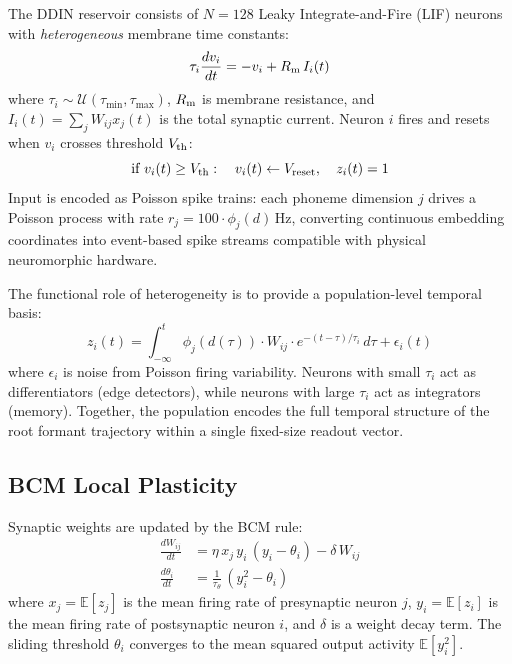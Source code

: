 \documentclass{article}
\begin{document}
The DDIN reservoir consists of $N = 128$ Leaky Integrate-and-Fire (LIF) neurons with \textit{heterogeneous} membrane time constants:
\begin{equation}
  \tau_i \frac{dv_i}{dt} = -v_i + R_{\rm m}\,I_i(t)
  \label{eq:lif}
\end{equation}
where $\tau_i \sim \mathcal{U}(\tau_{\min}, \tau_{\max})$, $R_{\rm m}$ is membrane resistance, and $I_i(t) = \sum_j W_{ij} x_j(t)$ is the total synaptic current. Neuron $i$ fires and resets when $v_i$ crosses threshold $V_{\rm th}$:
\begin{equation}
\text{if } v_i(t) \geq V_{\rm th}: \quad v_i(t) \leftarrow V_{\rm reset},\quad z_i(t) = 1
\label{eq:spike}
\end{equation}
Input is encoded as Poisson spike trains: each phoneme dimension $j$ drives a Poisson process with rate $r_j = 100 \cdot \phi_j(d)\,\mathrm{Hz}$, converting continuous embedding coordinates into event-based spike streams compatible with physical neuromorphic hardware.

The functional role of heterogeneity is to provide a population-level temporal basis:
\begin{equation}
z_i(t) = \int_{-\infty}^t \phi_j(d(\tau)) \cdot W_{ij} \cdot e^{-(t-\tau)/\tau_i} \, d\tau + \epsilon_i(t)
\label{eq:readout}
\end{equation}
where $\epsilon_i$ is noise from Poisson firing variability. Neurons with small $\tau_i$ act as differentiators (edge detectors), while neurons with large $\tau_i$ act as integrators (memory). Together, the population encodes the full temporal structure of the root formant trajectory within a single fixed-size readout vector.

\subsection{BCM Local Plasticity}
\label{sec:bcm_dynamics}

Synaptic weights are updated by the BCM rule:
\begin{align}
\frac{dW_{ij}}{dt} &= \eta\, x_j\, y_i\,(y_i - \theta_i) - \delta\, W_{ij}
\label{eq:bcm}\\
\frac{d\theta_i}{dt} &= \frac{1}{\tau_\theta}\,(y_i^2 - \theta_i)
\label{eq:theta}
\end{align}
where $x_j = \mathbb{E}[z_j]$ is the mean firing rate of presynaptic neuron $j$, $y_i = \mathbb{E}[z_i]$ is the mean firing rate of postsynaptic neuron $i$, and $\delta$ is a weight decay term. The sliding threshold $\theta_i$ converges to the mean squared output activity $\mathbb{E}[y_i^2]$.
\end{document}
